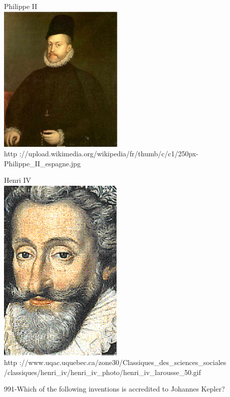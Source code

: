 \documentclass[letterpaper, 12pt]{article}
\begin{document}
        \begin{center}
        Philippe II\\
    \includegraphics[width=6cm]{phil.eps}\\
        {\footnotesize http
://upload.wikimedia.org/wikipedia/fr/thumb/c/c1/250px-Philippe\_II\_espagne.jpg}
    \end{center}

        \begin{center}
        Henri IV\\
    \includegraphics[width=6cm]{henri.eps}\\
        {\footnotesize http
://www.uqac.uquebec.ca/zone30/Classiques\_des\_sciences\_sociales\\
        /classiques/henri\_iv/henri\_iv\_photo/henri\_iv\_larousse\_50.gif}
    \end{center}

991-Which of the following inventions is accredited to Johannes Kepler?\\
\end{document}
